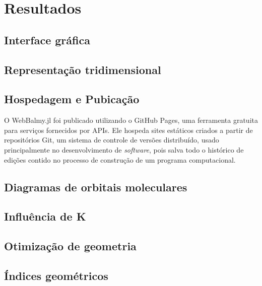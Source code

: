 \chapter{Resultados}
\section{Interface gráfica}

\section{Representação tridimensional}

\section{Hospedagem e Pubicação}

O WebBalmy.jl foi publicado utilizando o GitHub Pages, uma ferramenta gratuita para serviços fornecidos por APIs. Ele hospeda sites estáticos criados a partir de repositórios Git, um sistema de controle de versões distribuído, usado principalmente no desenvolvimento de \textit{software}, pois salva todo o histórico de edições contido no processo de construção de um programa computacional. 

\section{Diagramas de orbitais moleculares}

\section{Influência de K}

\section{Otimização de geometria}

\section{Índices geométricos}